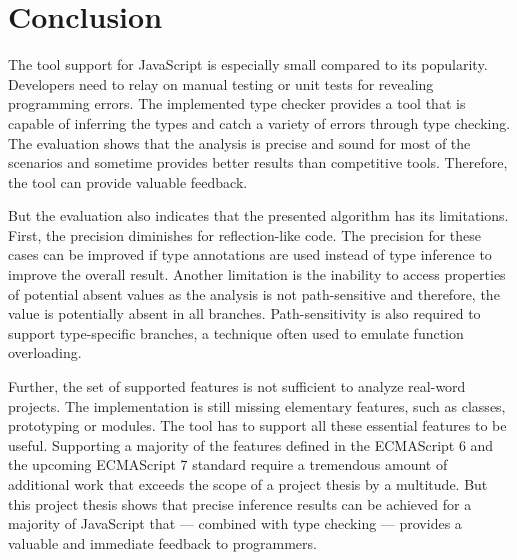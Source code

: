 \section{Conclusion}\label{sec:conclusion}
The tool support for JavaScript is especially small compared to its popularity. Developers need to relay on manual testing or unit tests for revealing programming errors. The implemented type checker provides a tool that is capable of inferring the types and catch a variety of errors through type checking. The evaluation shows that the analysis is precise and sound for most of the scenarios and sometime provides better results than competitive tools. Therefore, the tool can provide valuable feedback. 

But the evaluation also indicates that the presented algorithm has its limitations. First, the precision diminishes for reflection-like code. The precision for these cases can be improved if type annotations are used instead of type inference to improve the overall result. Another limitation is the inability to access properties of potential absent values as the analysis is not path-sensitive and therefore, the value is potentially absent in all branches. Path-sensitivity is also required to support type-specific branches, a technique often used to emulate function overloading. 

Further, the set of supported features is not sufficient to analyze real-word projects. The implementation is still missing elementary features, such as classes, prototyping or modules. The tool has to support all these essential features to be useful. Supporting a majority of the features defined in the ECMAScript 6 and the upcoming ECMAScript 7 standard require a tremendous amount of additional work that exceeds the scope of a project thesis by a multitude. But this project thesis shows that precise inference results can be achieved for a majority of JavaScript that --- combined with type checking --- provides a valuable and immediate feedback to programmers. 